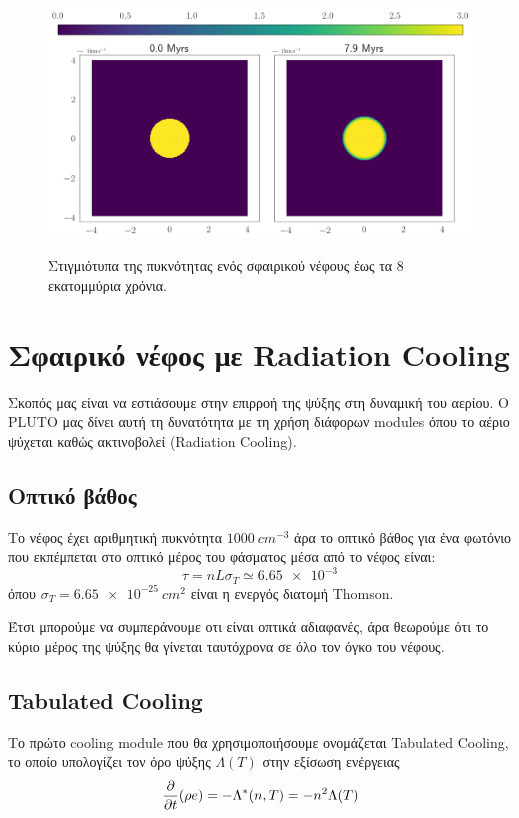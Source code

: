 	\begin{figure}[h]
		\centering
		\includegraphics[width=1.0\linewidth]{DataImages/NoCoolingRHOquad}
		\label{fig:NoCoolingRHOquad}
		\caption{Στιγμιότυπα της πυκνότητας ενός σφαιρικού νέφους έως τα 8 εκατομμύρια χρόνια.}
	\end{figure}	
	
	\section{Σφαιρικό νέφος με Radiation Cooling}
	Σκοπός μας είναι να εστιάσουμε στην επιρροή της ψύξης στη δυναμική του αερίου. Ο PLUTO μας δίνει αυτή τη δυνατότητα με τη χρήση διάφορων modules όπου το αέριο ψύχεται καθώς ακτινοβολεί (Radiation Cooling). 

	\subsection{Οπτικό βάθος}
	Το νέφος έχει αριθμητική πυκνότητα $\SI{1000}{cm^{-3}}$ άρα το οπτικό βάθος για ένα φωτόνιο που εκπέμπεται στο οπτικό μέρος του φάσματος μέσα από το νέφος είναι:
	\begin{equation}
	\tau = nL\sigma _T\simeq \num{6.65e-3}
	\end{equation}
	όπου $\sigma _T = \SI{6.65e-25}{cm^2}$ είναι η ενεργός διατομή Thomson.
	
	Έτσι μπορούμε να συμπεράνουμε οτι είναι οπτικά αδιαφανές, άρα θεωρούμε ότι το κύριο μέρος της ψύξης θα γίνεται ταυτόχρονα σε όλο τον όγκο του νέφους. 
	
	\subsection{Tabulated Cooling}
	Το πρώτο cooling module που θα χρησιμοποιήσουμε ονομάζεται Tabulated Cooling, το οποίο υπολογίζει τον όρο ψύξης $\Lambda (T )$ στην εξίσωση ενέργειας 
	\begin{equation}
		\pdv{t}(\rho e)=-\Lambda^*(n,T)=-n^2 \Lambda(T)
	\end{equation}
	

